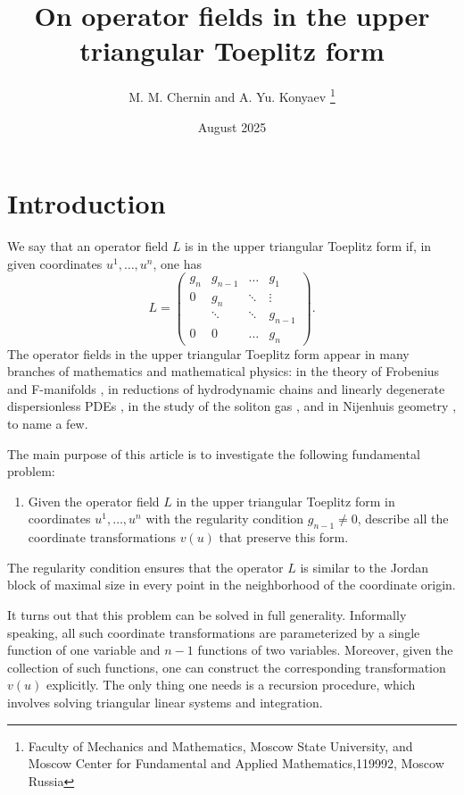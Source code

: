 \documentclass[12pt]{article}
\title{On operator fields in the upper triangular Toeplitz form}
\author{M. M. Chernin and A. Yu. Konyaev \footnote{Faculty of Mechanics and Mathematics, Moscow State University, and Moscow Center for Fundamental and Applied Mathematics,119992, Moscow Russia}}
\date{August 2025}
\theoremstyle{remark}
\begin{document}
\maketitle

\section{Introduction}

We say that an operator field $L$ is in the upper triangular Toeplitz form \cite{bottcher} if, in given coordinates $u^1, \dots, u^n$, one has
\begin{equation}\label{toeplitz}
L = \left( \begin{array}{cccc}
     g_n & g_{n - 1} & \dots & g_1  \\
     0 &  g_n & \ddots & \vdots \\
     & \ddots &\ddots  & g_{n - 1}\\
     0 & 0 & \dots  & g_n
\end{array}\right).    
\end{equation}
The operator fields in the upper triangular Toeplitz form appear in many branches of mathematics and mathematical physics: in the theory of Frobenius and F-manifolds \cite{antonov, perletti, perletti2}, in reductions of hydrodynamic chains and linearly degenerate dispersionless PDEs \cite{pavlov}, in the study of the soliton gas \cite{vergallo, vergallo2}, and in Nijenhuis geometry \cite{curv, nij4, app_nij5, nij1}, to name a few. 

The main purpose of this article is to investigate the following fundamental problem: 
\begin{enumerate}
    \item[Q:] Given the operator field $L$ in the upper triangular Toeplitz form in coordinates $u^1, \dots, u^n$ with the regularity condition $g_{n - 1} \neq 0$, describe all the coordinate transformations $v(u)$ that preserve this form.
\end{enumerate}
The regularity condition ensures that the operator $L$ is similar to the Jordan block of maximal size in every point in the neighborhood of the coordinate origin. 

It turns out that this problem can be solved in full generality. Informally speaking, all such coordinate transformations are parameterized by a single function of one variable and $n - 1$ functions of two variables. Moreover, given the collection of such functions, one can construct the corresponding transformation $v(u)$ explicitly. The only thing one needs is a recursion procedure, which involves solving triangular linear systems and integration. 
\end{document}

